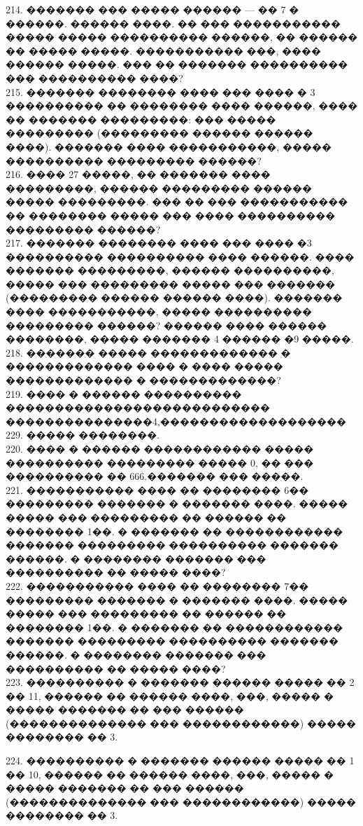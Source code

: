 \documentclass[12pt]{article}
\begin{document}
214. ������� ��� ����� ������ --- �� 7 � ������. ������ ����. �� ��� ����������� ����� ����� ���������� ������, �� ������ �� ����� �����. ����������� ���, ���� ������ �����. ��� �� ������� ���������� ��� ���������� ����?\\
215. ������� �������� ���� ��� ���� � 3 ���������� �� �������� ���� ������, ���� �� ������� ���������: ��� ����� ��������� (��������� ������ ������ ����). ������� ���� �����������, ����� ���������� ��������� ������?\\
216. ���� 27 �����, �� ������� ���� ���������, ������ ��������� ������ ����� ���������. ��� �� ��� ����������� �� �������� ����� ��� ���� ���������� ��������� ������?\\
217. ������� �������� ���� ��� ���� �3 ���������� ���������� ���� ������. ���� ������� ���������, ������ ����������, ����� ��� ��������� ����� ��� ������� (��������� ������ ������ ����). ������� ���� �����������, ����� ���������� ��������� ������? ������ ���� ������ ��������, ����� ������� 4 ������ �9 �����.\\
218. ������� ����� ������������� � ������������� ���� � ���� ����� ������������� � �������������?\\
219. ���� � ������ ���������� ��������������������������� ���������������4,������������������� 229. ����� ��������.\\
220. ���� � ������ ������������ ����� ���������� ��������� ����� 0, �� ��� ���������� �� 666.������� ��� �����.\\
221. ����������� ���� �� �������� 6�� ��������� ������� � ������� ����. ����� ����� ��� ��������� �� ������ �� �������� 1��. � ������� �� ������������ ������� ��������� ���������� ������� ������. � �������� ������� ��� ���������� �� ����� ����?\\
222. ����������� ���� �� �������� 7�� ��������� ������� � ������� ����. ����� ����� ��� ��������� �� ������ �� �������� 1��. � ������� �� ������������ ������� ��������� ���������� ������� ������. � �������� ������� ��� ���������� �� ����� ����?\\
223. ���������� � ������� ������ ����� �� 2 �� 11, ������ �� ������ ����, ���, ����� � ����� ������� �� ��� ������ (�������������� ��� ������������) ����� �������� �� 3.
\begin{center}
\begin{figure}[ht!]
\end{figure}
\end{center}
224. ���������� � ������� ������ ����� �� 1 �� 10, ������ �� ������ ����, ���, ����� � ����� ������� �� ��� ������ (�������������� ��� ������������) ����� �������� �� 3.
\end{document}
